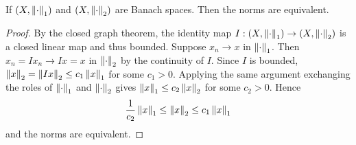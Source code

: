 \begin{proposition}\label{prop:equivalent_norm}
    If $(X,\left\lVert {\cdot} \right\rVert_1)$ and $(X,\left\lVert {\cdot} \right\rVert_2)$ are Banach spaces. Then 
    the norms are equivalent.
\end{proposition}
\begin{proof}
    By the closed graph theorem, the identity map $I:(X,\left\lVert {\cdot} \right\rVert_1)\to(X,\left\lVert {\cdot} \right\rVert_2)$ 
    is a closed linear map and thus bounded. Suppose $x_n\to x$ in $\left\lVert {\cdot} \right\rVert_1$. 
    Then $x_n = Ix_n\to Ix = x$ in $\left\lVert {\cdot} \right\rVert_2$ by the continuity of $I$. Since 
    $I$ is bounded, $\left\lVert {x} \right\rVert_2 = \left\lVert {Ix} \right\rVert_2 \leq c_1\left\lVert {x} \right\rVert_1$ for some $c_1>0$. 
    Applying the same argument exchanging the roles of $\left\lVert {\cdot} \right\rVert_1$ and $\left\lVert {\cdot} \right\rVert_2$ 
    gives $\left\lVert {x} \right\rVert_1 \leq c_2\left\lVert {x} \right\rVert_2$ for some $c_2>0$. Hence 
    \begin{equation*}
        \frac{1}{c_2}\left\lVert {x} \right\rVert_1 \leq \left\lVert {x} \right\rVert_2 \leq c_1\left\lVert {x} \right\rVert_1
    \end{equation*}
    and the norms are equivalent.
\end{proof}
